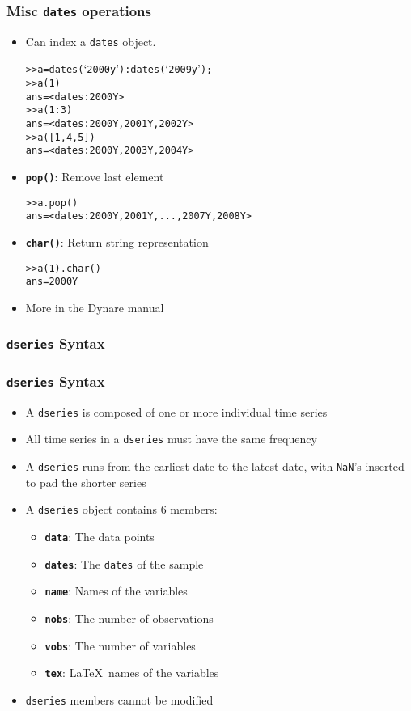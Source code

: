 \documentclass[10pt]{beamer}
\newcommand{\myitem}{\item[$\bullet$]}
\begin{document}
\begin{frame}[fragile,t]
  \frametitle{Misc \texttt{dates} operations}
  \begin{itemize}
    \myitem Can index a \texttt{dates} object.
    \begin{alltt}
  >> a = dates(`2000y'):dates(`2009y');
  >> a(1)
  ans = <dates: 2000Y>
  >> a(1:3)
  ans = <dates: 2000Y, 2001Y, 2002Y>
  >> a([1,4,5])
  ans = <dates: 2000Y, 2003Y, 2004Y>
    \end{alltt}
    \myitem{\textbf{\texttt{pop()}}}: Remove last element
    \begin{alltt}
  >> a.pop()
  ans = <dates: 2000Y, 2001Y,  ..., 2007Y, 2008Y>
    \end{alltt}
    \myitem{\textbf{\texttt{char()}}}: Return string representation
    \begin{alltt}
  >> a(1).char()
  ans = 2000Y
    \end{alltt}
    \myitem More in the Dynare manual
  \end{itemize}
\end{frame}


%
%
\subsubsection{\texttt{dseries} Syntax}
\begin{frame}[fragile,t]
  \frametitle{\texttt{dseries} Syntax}
  \begin{itemize}
    \myitem A \texttt{dseries} is composed of one or more individual time series
    \myitem All time series in a \texttt{dseries} must have the same frequency
    \myitem A \texttt{dseries} runs from the earliest date to the latest date,
    with \texttt{NaN}'s inserted to pad the shorter series
    \myitem A \texttt{dseries} object contains 6 members:
    \begin{itemize}
      \myitem{\textbf{\texttt{data}}}: The data points
      \myitem{\textbf{\texttt{dates}}}: The \texttt{dates} of the sample
      \myitem{\textbf{\texttt{name}}}: Names of the variables
      \myitem{\textbf{\texttt{nobs}}}: The number of observations
      \myitem{\textbf{\texttt{vobs}}}: The number of variables
      \myitem{\textbf{\texttt{tex}}}: \LaTeX\ names of the variables
    \end{itemize}
    \myitem \texttt{dseries} members cannot be modified
  \end{itemize}
\end{frame}
\end{document}

